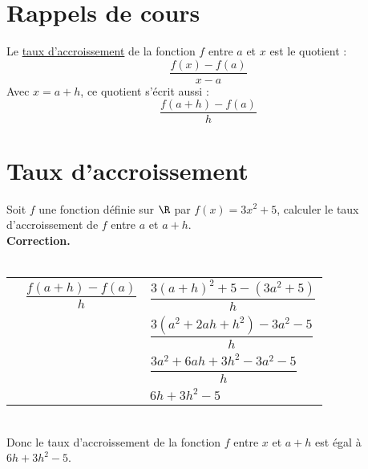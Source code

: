 \documentclass[11pt]{article}
\begin{document}
\section{Rappels de cours}

\begin{definition}
Le \underline{taux d'accroissement} de la fonction $f$ entre $a$ et $x$ est le quotient :
$$\dfrac{f(x)-f(a)}{x-a}$$
Avec $x=a+h$, ce quotient s'écrit aussi : $$\dfrac{f(a+h)-f(a)}{h}$$
\end{definition}

\section{Taux d'accroissement}

\begin{exercice}
   Soit $f$ une fonction définie sur $\R$ par $f(x)=3x^2+5$, calculer le taux
   d'accroissement de $f$ entre $a$ et $a+h$. \\
\textbf{Correction.}\\ \\
   \begin{tabular}{p{0.3cm}l!{=}l}
      &  $\dfrac{f(a+h)-f(a)}{h}$ & $\dfrac{3(a+h)^2+5-(3a^2+5)}{h}$ \\
      & & $\dfrac{3(a^2+2ah+h^2)-3a^2-5}{h}$ \\
      & & $\dfrac{3a^2+6ah+3h^2-3a^2-5}{h}$ \\
      & & $6h+3h^2-5$ \\
   \end{tabular}\\
Donc le taux d'accroissement de la fonction $f$ entre $x$ et $a+h$ est
égal à $6h+3h^2-5$.
\end{exercice}
\end{document}
